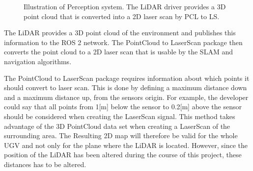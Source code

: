 \begin{figure}[htp]
    \fontsize{9}{14}\selectfont
    \centering
    
    \caption{Illustration of Perception system. The LiDAR driver provides a 3D point cloud that is converted into a 2D laser scan by PCL to LS.}
    \label{fig:M:AN:P:Perception}
\end{figure}

The LiDAR provides a 3D point cloud of the environment and publishes this information to the ROS 2 network. The PointCloud to LaserScan package then converts the point cloud to a 2D laser scan that is usable by the SLAM and navigation algorithms.

The PointCloud to LaserScan package requires information about which points it should convert to laser scan. This is done by defining a maximum distance down and a maximum distance up, from the sensors origin. For example, the developer could say that all points from 1[m] below the sensor to 0.2[m] above the sensor should be considered when creating the LaserScan signal. This method takes advantage of the 3D PointCloud data set when creating a LaserScan of the surrounding area. The Resulting 2D map will therefore be valid for the whole UGV and not only for the plane where the LiDAR is located. However, since the position of the LiDAR has been altered during the course of this project, these distances has to be altered.






